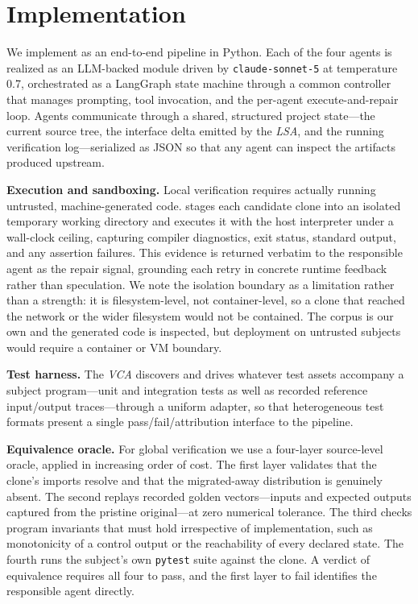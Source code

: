 \section{Implementation}
\label{sec:impl}

We implement \sys as an end-to-end pipeline in Python. Each of the four agents is realized as an LLM-backed module driven by \texttt{claude-sonnet-5} at temperature 0.7, orchestrated as a LangGraph state machine through a common controller that manages prompting, tool invocation, and the per-agent execute-and-repair loop. Agents communicate through a shared, structured project state---the current source tree, the interface delta emitted by the \emph{LSA}, and the running verification log---serialized as JSON so that any agent can inspect the artifacts produced upstream.

\textbf{Execution and sandboxing.}
Local verification requires actually running untrusted, machine-generated code. \sys stages each candidate clone into an isolated temporary working directory and executes it with the host interpreter under a wall-clock ceiling, capturing compiler diagnostics, exit status, standard output, and any assertion failures. This evidence is returned verbatim to the responsible agent as the repair signal, grounding each retry in concrete runtime feedback rather than speculation. We note the isolation boundary as a limitation rather than a strength: it is filesystem-level, not container-level, so a clone that reached the network or the wider filesystem would not be contained. The corpus is our own and the generated code is inspected, but deployment on untrusted subjects would require a container or VM boundary.

\textbf{Test harness.}
The \emph{VCA} discovers and drives whatever test assets accompany a subject program---unit and integration tests as well as recorded reference input/output traces---through a uniform adapter, so that heterogeneous test formats present a single pass/fail/attribution interface to the pipeline.

\textbf{Equivalence oracle.}
For global verification we use a four-layer source-level oracle, applied in increasing order of cost. The first layer validates that the clone's imports resolve and that the migrated-away distribution is genuinely absent. The second replays recorded golden vectors---inputs and expected outputs captured from the pristine original---at zero numerical tolerance. The third checks program invariants that must hold irrespective of implementation, such as monotonicity of a control output or the reachability of every declared state. The fourth runs the subject's own \texttt{pytest} suite against the clone. A verdict of equivalence requires all four to pass, and the first layer to fail identifies the responsible agent directly.

